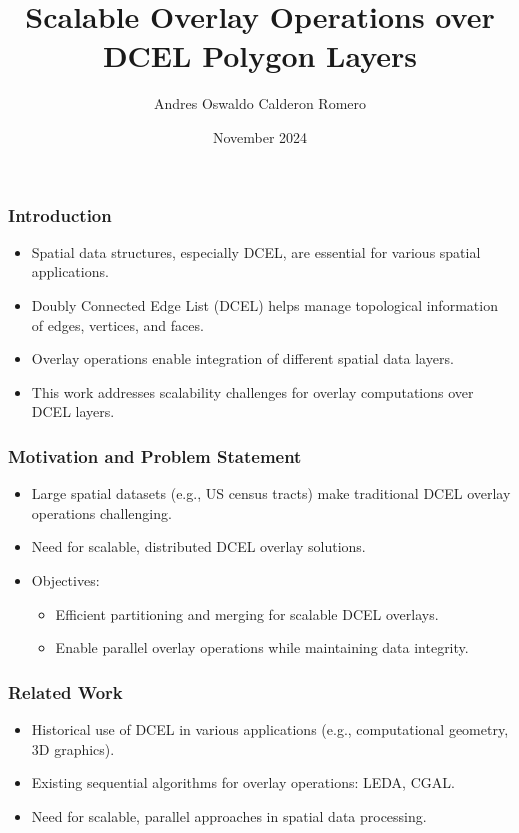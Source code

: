 \documentclass{beamer}
\title{Scalable Overlay Operations over DCEL Polygon Layers}
\author{Andres Oswaldo Calderon Romero}
\institute{University of California, Riverside}
\date{November 2024}
\begin{document}
\begin{frame}
    \titlepage
\end{frame}

\begin{frame}
    \frametitle{Introduction}
    \begin{itemize}
        \item Spatial data structures, especially DCEL, are essential for various spatial applications.
        \item Doubly Connected Edge List (DCEL) helps manage topological information of edges, vertices, and faces.
        \item Overlay operations enable integration of different spatial data layers.
        \item This work addresses scalability challenges for overlay computations over DCEL layers.
    \end{itemize}
\end{frame}

\begin{frame}
    \frametitle{Motivation and Problem Statement}
    \begin{itemize}
        \item Large spatial datasets (e.g., US census tracts) make traditional DCEL overlay operations challenging.
        \item Need for scalable, distributed DCEL overlay solutions.
        \item Objectives:
        \begin{itemize}
            \item Efficient partitioning and merging for scalable DCEL overlays.
            \item Enable parallel overlay operations while maintaining data integrity.
        \end{itemize}
    \end{itemize}
\end{frame}

\begin{frame}
    \frametitle{Related Work}
    \begin{itemize}
        \item Historical use of DCEL in various applications (e.g., computational geometry, 3D graphics).
        \item Existing sequential algorithms for overlay operations: LEDA, CGAL.
        \item Need for scalable, parallel approaches in spatial data processing.
    \end{itemize}
\end{frame}
\end{document}
